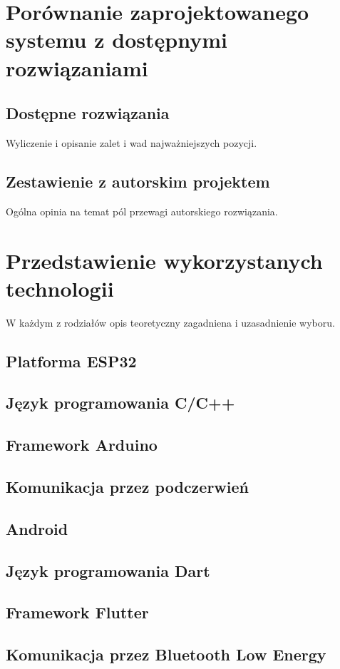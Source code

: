 \documentclass[12pt,twoside]{article}
\begin{document}
\clearpage
\section{Porównanie zaprojektowanego systemu z dostępnymi rozwiązaniami}
\subsection{Dostępne rozwiązania}
Wyliczenie i opisanie zalet i wad najważniejszych pozycji.
\subsection{Zestawienie z autorskim projektem}
Ogólna opinia na temat pól przewagi autorskiego rozwiązania.
\clearpage
\section{Przedstawienie wykorzystanych technologii}
W każdym z rodziałów opis teoretyczny zagadniena i uzasadnienie wyboru.
\subsection{Platforma ESP32}
\subsection{Język programowania C/C++}
\subsection{Framework Arduino}
\subsection{Komunikacja przez podczerwień}
\subsection{Android}
\subsection{Język programowania Dart}
\subsection{Framework Flutter}
\subsection{Komunikacja przez Bluetooth Low Energy}
\end{document}
